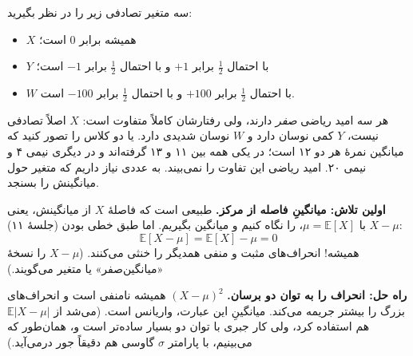سه متغیر تصادفی زیر را در نظر بگیرید:
\begin{itemize}
  \item $X$ همیشه برابر $0$ است؛
  \item $Y$ با احتمال $\tfrac12$ برابر $+1$ و با احتمال $\tfrac12$ برابر $-1$ است؛
  \item $W$ با احتمال $\tfrac12$ برابر $+100$ و با احتمال $\tfrac12$ برابر $-100$ است.
\end{itemize}
هر سه امید ریاضی \emph{صفر} دارند، ولی رفتارشان کاملاً متفاوت است: $X$ اصلاً تصادفی نیست، $Y$ کمی نوسان دارد و $W$ نوسان شدیدی دارد. یا دو کلاس را تصور کنید که میانگین نمرهٔ هر دو ۱۲ است؛ در یکی همه بین ۱۱ و ۱۳ گرفته‌اند و در دیگری نیمی ۴ و نیمی ۲۰. امید ریاضی این تفاوت را نمی‌بیند. به عددی نیاز داریم که  متغیر حول میانگینش را بسنجد.

\begin{figblock}

\end{figblock}

\textbf{اولین تلاش: میانگینِ فاصله از مرکز.} طبیعی است که فاصلهٔ $X$ از میانگینش، یعنی $X-\mu$ با $\mu=\mathbb E[X]$، را نگاه کنیم و میانگین بگیریم. اما طبق خطی بودن (جلسهٔ ۱۱):
\[ \mathbb E[X-\mu]=\mathbb E[X]-\mu=0 \]
همیشه! انحراف‌های مثبت و منفی همدیگر را خنثی می‌کنند. ($X-\mu$ را نسخهٔ «میانگین‌صفر» یا  متغیر می‌گویند.)

\textbf{راه حل: انحراف را به توان دو برسان.} $(X-\mu)^2$ همیشه نامنفی است و انحراف‌های بزرگ را بیشتر جریمه می‌کند. میانگینِ این عبارت، واریانس است. (می‌شد از $\mathbb E|X-\mu|$ هم استفاده کرد، ولی کار جبری با توان دو بسیار ساده‌تر است و، همان‌طور که می‌بینیم، با پارامتر $\sigma$ گاوسی هم دقیقاً جور درمی‌آید.)

